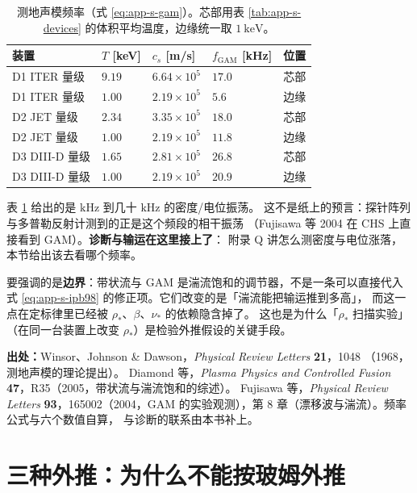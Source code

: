 \begin{table}[htbp]
  \centering
  \caption{测地声模频率（式 \eqref{eq:app-s-gam}）。芯部用表 \ref{tab:app-s-devices}
    的体积平均温度，边缘统一取 $1\ \mathrm{keV}$。}
  \label{tab:app-s-gam}
  \begin{tabular}{@{}p{3.0cm}p{2.4cm}p{2.4cm}p{2.4cm}p{2.6cm}@{}}
    \toprule
    装置 & $T$ [keV] & $c_s$ [m/s] & $f_{\mathrm{GAM}}$ [kHz] & 位置 \\
    \midrule
    D1 ITER 量级 & $9.19$ & $6.64\times10^5$ & $17.0$ & 芯部 \\
    D1 ITER 量级 & $1.00$ & $2.19\times10^5$ & $5.6$ & 边缘 \\
    D2 JET 量级 & $2.34$ & $3.35\times10^5$ & $18.0$ & 芯部 \\
    D2 JET 量级 & $1.00$ & $2.19\times10^5$ & $11.8$ & 边缘 \\
    D3 DIII-D 量级 & $1.65$ & $2.81\times10^5$ & $26.8$ & 芯部 \\
    D3 DIII-D 量级 & $1.00$ & $2.19\times10^5$ & $20.9$ & 边缘 \\
    \bottomrule
  \end{tabular}
\end{table}

表 \ref{tab:app-s-gam} 给出的是 $\mathrm{kHz}$ 到几十 $\mathrm{kHz}$ 的密度/电位振荡。
这不是纸上的预言：探针阵列与多普勒反射计测到的正是这个频段的相干振荡
（Fujisawa 等 2004 在 CHS 上直接看到 GAM）。\textbf{诊断与输运在这里接上了}：
附录 Q 讲怎么测密度与电位涨落，本节给出该去看哪个频率。

要强调的是\textbf{边界}：带状流与 GAM 是湍流饱和的调节器，不是一条可以直接代入
式 \eqref{eq:app-s-ipb98} 的修正项。它们改变的是「湍流能把输运推到多高」，
而这一点在定标律里已经被 $\rho_\ast$、$\beta$、$\nu_\ast$ 的依赖隐含掉了。
这也是为什么「$\rho_\ast$ 扫描实验」（在同一台装置上改变 $\rho_\ast$）是检验外推假设的关键手段。

{\footnotesize
\textbf{出处：}Winsor、Johnson \& Dawson，\textit{Physical Review Letters} \textbf{21}，1048
（1968，测地声模的理论提出）。
Diamond 等，\textit{Plasma Physics and Controlled Fusion}
\textbf{47}，R35（2005，带状流与湍流饱和的综述）。
Fujisawa 等，\textit{Physical Review Letters}
\textbf{93}，165002（2004，GAM 的实验观测），第 8 章（漂移波与湍流）。频率公式与六个数值自算，
与诊断的联系由本书补上。
}


\section{三种外推：为什么不能按玻姆外推}
\label{sec:app-s-extrap}

